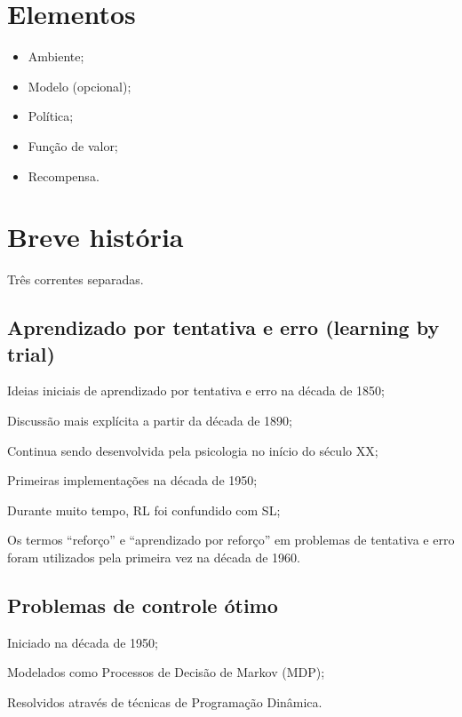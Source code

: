 \documentclass{article}
\begin{document}
    \section{Elementos}
    
        \begin{itemize}
            \item Ambiente;
            \item Modelo (opcional);
            \item Política;
            \item Função de valor;
            \item Recompensa.
        \end{itemize}
    
    \section{Breve história}
    
        Três correntes separadas.
        
        \subsection{Aprendizado por tentativa e erro (learning by trial)}
            Ideias iniciais de aprendizado por tentativa e erro na década de 1850;
            
            Discussão mais explícita a partir da década de 1890;
            
            Continua sendo desenvolvida pela psicologia no início do século XX;
            
            Primeiras implementações na década de 1950;
            
            Durante muito tempo, RL foi confundido com SL;
            
            Os termos “reforço” e “aprendizado por reforço” em problemas de tentativa e erro foram utilizados pela primeira vez na década de 1960.
    
        
        \subsection{Problemas de controle ótimo}
            Iniciado na década de 1950;
            
            Modelados como Processos de Decisão de Markov (MDP);
            
            Resolvidos através de técnicas de Programação Dinâmica.
    
\end{document}

